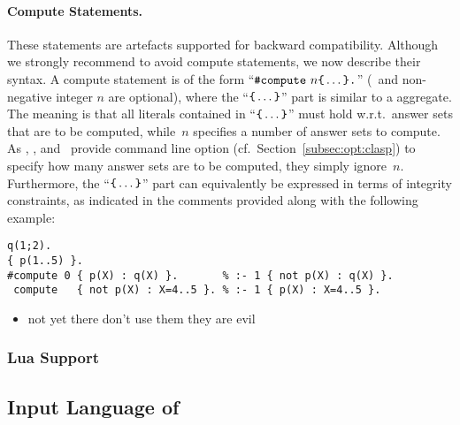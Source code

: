 \paragraph{Compute Statements.}
These statements are artefacts supported for backward compatibility.
Although we strongly recommend to avoid compute statements,
we now describe their syntax.
A compute statement is of the form
``$\const{\#compute}~n \code{\char`\{}\dots\code{\char`\}}\code{.}$''
(\code{\#}~and non-negative integer $n$ are optional),
where the ``$\code{\char`\{}\dots\code{\char`\}}$'' part
is similar to a  aggregate.
The meaning is that all literals contained in
``$\code{\char`\{}\dots\code{\char`\}}$'' must hold w.r.t.\ answer sets
that are to be computed,
while~$n$ specifies a number of answer sets to compute.
As \clasp, \clingo, and \iclingo\ provide command line option
 (cf.\ Section~\ref{subsec:opt:clasp})
to specify how many answer sets are to be computed,
they simply ignore~$n$.
Furthermore,
the ``$\code{\char`\{}\dots\code{\char`\}}$'' part can equivalently
be expressed in terms of integrity constraints,
as indicated in the comments provided along with the following example:
%
\begin{lstlisting}[xrightmargin=-20pt,numbers=none]
q(1;2).
{ p(1..5) }.
#compute 0 { p(X) : q(X) }.       % :- 1 { not p(X) : q(X) }.
 compute   { not p(X) : X=4..5 }. % :- 1 { p(X) : X=4..5 }.
\end{lstlisting}
\begin{newstuff}
	\begin{itemize}
		\item not yet there don't use them they are evil
	\end{itemize}
\end{newstuff}

\begin{newstuff}
\subsubsection{Lua Support}\label{subsec:lang:lua}
\end{newstuff}

\subsection{Input Language of \iclingo}\label{subsec:lang:iclingo}

